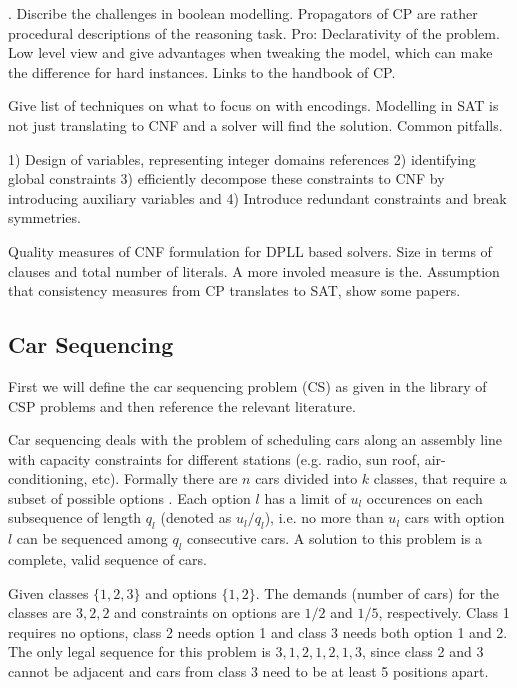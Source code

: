 \documentclass[]{llncs}
\newcommand{\todo}[1]{ {\color{red}{#1} }}
\begin{document}
\todo{4}. Discribe the challenges in boolean modelling. Propagators of CP are rather procedural descriptions of the reasoning
task. Pro: Declarativity of the problem. Low level view and give advantages when tweaking the model, which can make the
difference for hard instances. Links to the handbook of CP. 

Give list of techniques on what to focus on with encodings. Modelling in SAT is not just translating to CNF and a solver
will find the solution. Common pitfalls.  

1) Design of variables, representing integer domains references 2) identifying global constraints 3) efficiently decompose these
constraints to CNF by introducing auxiliary variables and 4) Introduce redundant constraints and break symmetries. 

Quality measures of CNF formulation for DPLL based solvers. Size in terms of clauses and total number of literals. A
more involed measure is the. Assumption that consistency measures from CP translates to SAT, show some papers. 

\subsection{Car Sequencing}

First we will define the car sequencing problem (CS) as given in the library of CSP problems \cite{Gent99} and then
reference the relevant literature. 

Car sequencing deals with the problem of scheduling cars along an assembly line with capacity constraints for different
stations (e.g. radio, sun roof, air-conditioning, etc).  Formally there are $n$ cars divided into $k$ classes, that require a
subset of possible options . Each option $l$ has a limit of $u_l$ occurences on each subsequence of length $q_l$
(denoted as $u_l/q_l$), i.e.  no more than $u_l$ cars with option $l$ can be sequenced among $q_l$ consecutive cars. A
solution to this problem is a complete, valid sequence of cars. 

\begin{example}
    Given classes $\{1,2,3\}$ and options $\{1,2\}$. The demands (number of cars) for the classes are $3,2,2$ and
    constraints on options are $1/2$ and $1/5$, respectively. Class 1 requires no options, class 2 needs option 1 and
    class 3 needs both option 1 and 2. The only legal sequence for this problem is $3,1,2,1,2,1,3$, since class 2 and 3
    cannot be adjacent and cars from class 3 need to be at least 5 positions apart. 
\end{example}                                     
\end{document}
